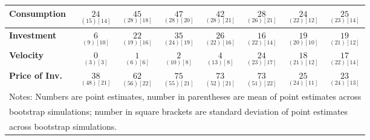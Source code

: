 \documentclass{article}
\begin{document}
\begin{tabular}{|l|c|@{}c|c|@{}c|c|@{}c|c|}
 \textbf{Consumption} & $\underset{( 15) [ 14]}{ 24}$ & $\underset{( 28) [ 18]}{ 45}$ & $\underset{( 28) [ 20]}{ 47}$ & $\underset{( 28) [ 21]}{ 42}$ & $\underset{( 26) [ 21]}{ 28}$ & $\underset{( 22) [ 12]}{ 24}$ & $\underset{( 23) [ 14]}{ 25}$ \\ \hline 
 \textbf{Investment} & $\underset{(  9) [ 10]}{  6}$ & $\underset{( 19) [ 16]}{ 22}$ & $\underset{( 24) [ 19]}{ 35}$ & $\underset{( 22) [ 16]}{ 26}$ & $\underset{( 22) [ 14]}{ 16}$ & $\underset{( 20) [ 10]}{ 19}$ & $\underset{( 21) [ 12]}{ 19}$ \\ \hline 
 \textbf{Velocity} & $\underset{(  3) [  3]}{  0}$ & $\underset{(  6) [  6]}{  1}$ & $\underset{( 10) [  8]}{  2}$ & $\underset{( 13) [  8]}{  4}$ & $\underset{( 23) [ 17]}{ 24}$ & $\underset{( 21) [ 12]}{ 18}$ & $\underset{( 22) [ 14]}{ 17}$ \\ \hline 
 \textbf{Price of Inv.} & $\underset{( 48) [ 21]}{ 38}$ & $\underset{( 56) [ 22]}{ 62}$ & $\underset{( 55) [ 21]}{ 75}$ & $\underset{( 52) [ 21]}{ 73}$ & $\underset{( 51) [ 22]}{ 73}$ & $\underset{( 24) [ 11]}{ 25}$ & $\underset{( 24) [ 13]}{ 23}$ \\ \hline 
 \multicolumn{8}{|l|}{Notes: Numbers are point estimates, number in 
 parentheses are mean of point estimates across} \\ \hline 
 \multicolumn{8}{|l|}{bootstrap simulations; number in square brackets are 
 standard deviation of point estimates} \\ \hline 
 \multicolumn{8}{|l|}{across bootstrap simulations.} \\ \hline 
 \end{tabular} 
\end{document}
